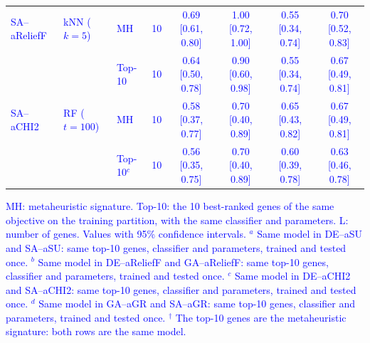 \begin{table}[!ht]
{\begin{tabular}{llllcccc}
\textcolor{blue}{SA--aReliefF} & \textcolor{blue}{kNN ($k=5$)} & \textcolor{blue}{MH} & \textcolor{blue}{10} & \textcolor{blue}{0.69 [0.61, 0.80]} & \textcolor{blue}{1.00 [0.72, 1.00]} & \textcolor{blue}{0.55 [0.34, 0.74]} & \textcolor{blue}{0.70 [0.52, 0.83]} \\
 &  & \textcolor{blue}{Top-10} & \textcolor{blue}{10} & \textcolor{blue}{0.64 [0.50, 0.78]} & \textcolor{blue}{0.90 [0.60, 0.98]} & \textcolor{blue}{0.55 [0.34, 0.74]} & \textcolor{blue}{0.67 [0.49, 0.81]} \\
\textcolor{blue}{SA--aCHI2} & \textcolor{blue}{RF ($t=100$)} & \textcolor{blue}{MH} & \textcolor{blue}{10} & \textcolor{blue}{0.58 [0.37, 0.77]} & \textcolor{blue}{0.70 [0.40, 0.89]} & \textcolor{blue}{0.65 [0.43, 0.82]} & \textcolor{blue}{0.67 [0.49, 0.81]} \\
 &  & \textcolor{blue}{Top-10$^{c}$} & \textcolor{blue}{10} & \textcolor{blue}{0.56 [0.35, 0.75]} & \textcolor{blue}{0.70 [0.40, 0.89]} & \textcolor{blue}{0.60 [0.39, 0.78]} & \textcolor{blue}{0.63 [0.46, 0.78]} \\
\hline
\end{tabular}}
\par\smallskip
\parbox{\textwidth}{\footnotesize\textcolor{blue}{MH: metaheuristic signature. Top-10: the 10 best-ranked genes of the same objective on the training partition, with the same classifier and parameters. L: number of genes. Values with 95\% confidence intervals. $^{a}$ Same model in DE--aSU and SA--aSU: same top-10 genes, classifier and parameters, trained and tested once. $^{b}$ Same model in DE--aReliefF and GA--aReliefF: same top-10 genes, classifier and parameters, trained and tested once. $^{c}$ Same model in DE--aCHI2 and SA--aCHI2: same top-10 genes, classifier and parameters, trained and tested once. $^{d}$ Same model in GA--aGR and SA--aGR: same top-10 genes, classifier and parameters, trained and tested once. $^{\dagger}$ The top-10 genes are the metaheuristic signature: both rows are the same model.}}
\end{table}
